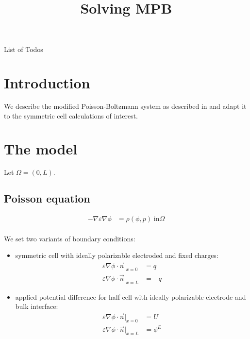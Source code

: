 \documentclass[12pt,oneside,reqno]{amsart}
\title{Solving MPB}
\makeatletter
\def\listtodoname{List of Todos}
\def\listoftodos{\@starttoc{tdo}\listtodoname}
\makeatother
\begin{document}
\maketitle

\tableofcontents{}
\listoftodos{}

\section{Introduction}
We describe the modified Poisson-Boltzmann system as described in  \cite{MuellerFuhrmannLandstorfer2020} and
adapt it to the symmetric cell calculations of interest.

\section{The model}

Let $\Omega = (0,L)$.

\subsection{Poisson equation}

\begin{equation}\label{eq:Poisson}
  \begin{aligned}
    -\nabla \varepsilon \nabla \phi & = \rho(\phi,p) \; \text{in} \Omega \\
  \end{aligned}
\end{equation}

We set two variants of boundary conditions:
\begin{itemize}
  \item symmetric cell with ideally polarizable electroded and fixed charges:
        \begin{equation}
          \label{eq:symmcell}
          \begin{aligned}
            \varepsilon\nabla\phi \cdot \vec n |_{x=0} & = q  \\
            \varepsilon\nabla\phi \cdot \vec n |_{x=L} & = -q
          \end{aligned}
        \end{equation}

  \item applied potential difference for half cell with ideally polarizable electrode and bulk interface:
        \begin{equation}
          \label{eq:halfcell}
          \begin{aligned}
            \varepsilon\nabla\phi \cdot \vec n |_{x=0} & = U      \\
            \varepsilon\nabla\phi \cdot \vec n |_{x=L} & = \phi^E
          \end{aligned}
        \end{equation}
\end{itemize}
\end{document}
